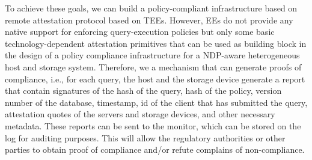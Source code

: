 To achieve these goals, we can build a policy-compliant infrastructure based on remote attestation protocol based on TEEs. However, EEs do not provide any native support for enforcing query-execution policies but only some basic technology-dependent attestation primitives that can be used as building block in the design of a policy compliance infrastructure for a NDP-aware heterogeneous host and storage system. Therefore, we  a mechanism that can generate proofs of compliance, i.e., for each query, the host and the storage device generate a report that contain signatures of the hash of the query, hash of the policy, version number of the database, timestamp, id of the client that has submitted the query, attestation quotes of the servers and storage devices, and other necessary metadata. These reports can be sent to the monitor, which can be stored on the log for auditing purposes. This will allow the regulatory authorities or other parties to obtain proof of compliance and/or refute complains of non-compliance.














